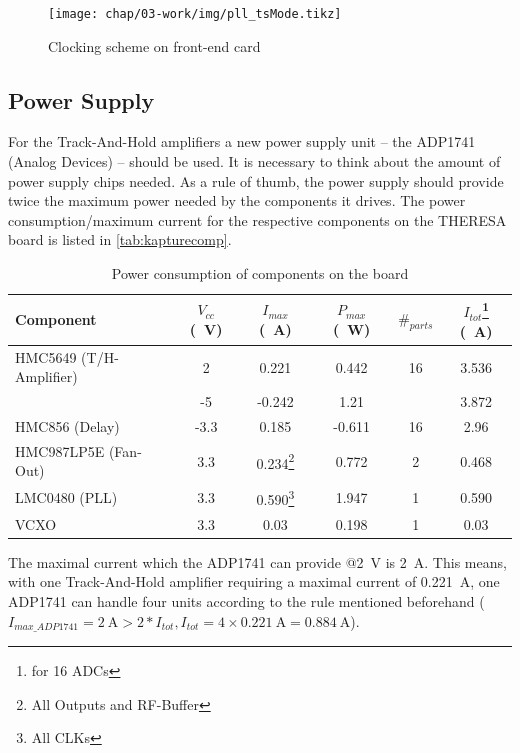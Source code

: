 \begin{figure}[H]
	\centering
	\texttt{[image: chap/03-work/img/pll\_tsMode.tikz]}
	\caption{Clocking scheme on front-end card}
	\label{fig:pll}
\end{figure}


\subsection{Power Supply}
For the Track-And-Hold amplifiers a new power supply unit -- the ADP1741 (Analog Devices) -- should be used. It is necessary to think about the amount of power supply chips needed. As a rule of thumb, the power supply should provide twice the maximum power needed by the components it drives. The power consumption/maximum current for the respective components on the THERESA board is listed in \autoref{tab:kapturecomp}. 
\begin{table}[tbh!]
	\caption{Power consumption of components on the board}
	\label{tab:kapturecomp}
	\begin{minipage}{\textwidth}
		\centering
		\begin{tabularx}{\textwidth}{XSSSSS}
			\toprule
			\textbf{Component} & \textbf{$V_{cc}$ (\SI{}{\volt})} & \textbf{$I_{max}$ (\SI{}{\ampere})} & \textbf{$P_{max}$ (\SI{}{\watt})} & $\#_{parts}$ & \textbf{$I_{tot}$}\footnote{for 16 ADCs} (\SI{}{\ampere})\\
				\midrule
			HMC5649 (T/H-Amplifier) 	& 2	  	& 0.221 	 & 0.442 & 16 & 3.536\\
									& -5  	& -0.242 & 1.21 &  & 3.872\\
			HMC856 (Delay) 			& -3.3	& 0.185 & -0.611 & 16 & 2.96\\
			HMC987LP5E (Fan-Out) 	& 3.3 	& 0.234\footnote{All Outputs and RF-Buffer} & 0.772 & 2 & 0.468\\
			LMC0480 (PLL) 			& 3.3 	& 0.590\footnote{All CLKs} & 1.947 & 1 & 0.590\\
			VCXO 					& 3.3 	& 0.03 & 0.198 & 1 & 0.03\\
			\bottomrule
		\end{tabularx}
	\end{minipage}
\end{table}

The maximal current which the ADP1741 can provide @\SI{2}{\volt} is \SI{2}{\ampere}. This means, with one Track-And-Hold amplifier requiring a maximal current of \SI{0.221}{\ampere}, one ADP1741 can handle four units according to the rule mentioned beforehand ($I_{max\_ADP1741} = \SI{2}{\ampere} > 2 * I_{tot}, I_{tot} = 4 \times \SI{0.221}{\ampere} =  \SI{0.884}{\ampere}$).



